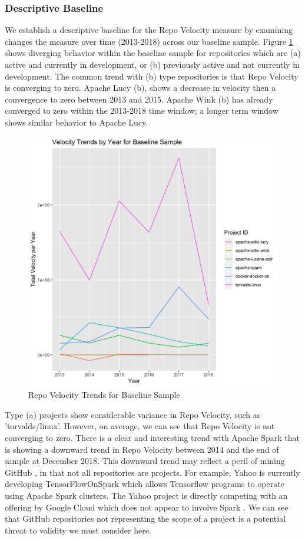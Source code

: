 \documentclass{article}
\begin{document}
\subsubsection{Descriptive Baseline}

We establish a descriptive baseline for the Repo Velocity measure by
examining changes the measure over time (2013-2018) across our baseline
sample. Figure \ref{fig:desc_baseline} shows diverging behavior within the
baseline sample for repositories which are (a) active and currently in
development, or (b) previously active and not currently in development. The
common trend with (b) type repositories is that Repo Velocity is converging
to zero. Apache Lucy (b), shows a decrease in velocity then a convergence to
zero between 2013 and 2015. Apache Wink (b) has already converged to zero
within the 2013-2018 time window; a longer term window shows similar
behavior to Apache Lucy.

\begin{figure}[h]
  \centering
  \includegraphics[scale=0.15]{f3}
  \caption{Repo Velocity Trends for Baseline Sample}
  \label{fig:desc_baseline}
\end{figure}

Type (a) projects show considerable variance in Repo Velocity, such as
'torvalds/linux'. However, on average, we can see that Repo Velocity is
not converging to zero. There is a clear and interesting trend with Apache
Spark that is showing a downward trend in Repo Velocity between 2014 and
the end of sample at December 2018. This downward trend may reflect a peril
of mining GitHub \cite{kalliamvakou2016depth}, in that not all repositories
are projects. For example, Yahoo is currently developing
TensorFlowOnSpark \cite{yahooTen24:online} which allows Tensorflow
programs to operate using Apache Spark clusters. The Yahoo project is
directly competing with an offering by Google Cloud which does not appear
to involve Spark \cite{RunningD43:online}. We can see that GitHub
repositories not representing the scope of a project is a potential
threat to validity we must consider here.
\end{document}
